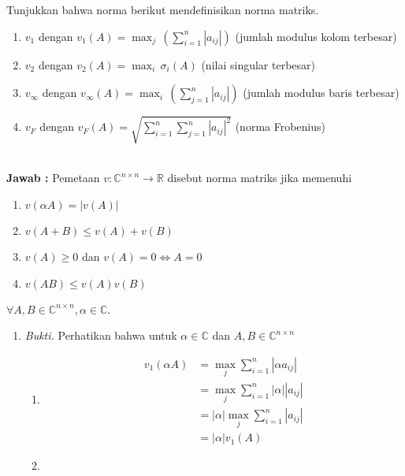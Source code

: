 \documentclass[11pt,a4paper]{article}
\newcommand{\ds}{\displaystyle}
\theoremstyle{plain}
\theoremstyle{definition}
\theoremstyle{remark}
\begin{document}
\begin{enumerate}
\begin{enumerate}
	\- \\
	\textbf{Jawab :} Pemetaan $v:\mathbb{C}^{n\times n}\rightarrow \mathbb{R}$ disebut norma matriks jika memenuhi 
	\begin{enumerate}
		\item[(i)] $v(\alpha A) = \left| v(A)\right|$
		\item[(ii)] $v(A+B)\leq v(A)+v(B)$
		\item[(iii)] $v(A)\geq 0$ dan $v(A)=0 \Leftrightarrow A=0$
		\item[(iv)] $v(AB)\leq v(A)v(B)$
	\end{enumerate}
	$\forall A,B\in \mathbb{C}^{n\times n}, \alpha\in \mathbb{C}$.
	\begin{enumerate}
		\item[(a)] \textit{Bukti.} Perhatikan bahwa untuk $\alpha\in \mathbb{C}$ dan $A,B\in \mathbb{C}^{n\times n}$
		\begin{enumerate}
			\item[i.] 
			\begin{align*}
			v_{1}(\alpha A) &=\ds \max_{j} \sum_{i=1}^{n} \left| \alpha a_{ij}\right| \\
			&=\ds \max_{j} \sum_{i=1}^{n} \left| \alpha \right| \left| a_{ij}\right| \\
			&=\ds \left| \alpha \right| \max_{j} \sum_{i=1}^{n} \left| a_{ij}\right| \\
			&= \left| \alpha \right| v_{1}(A)
			\end{align*}
			\item[ii.] 
			\begin{align*}

\end{align*}
\end{enumerate}
\end{enumerate}
\end{enumerate}
\end{enumerate}
\end{document}
